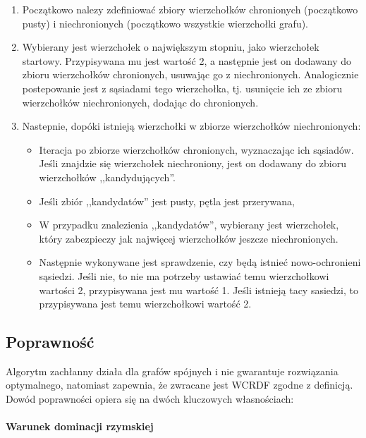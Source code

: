     \begin{enumerate}
        \item Początkowo nalezy zdefiniować zbiory wierzchołków chronionych (początkowo pusty) i niechronionych (początkowo wszystkie wierzchołki grafu).
        \item Wybierany jest wierzchołek o największym stopniu, jako wierzchołek startowy. Przypisywana mu jest wartość 2, a następnie jest on dodawany do zbioru wierzchołków chronionych, usuwając go z niechronionych. Analogicznie postepowanie jest z sąsiadami tego wierzchołka, tj. usunięcie ich ze zbioru wierzchołków niechronionych, dodając do chronionych. 
        \item Nastepnie, dopóki istnieją wierzchołki w zbiorze wierzchołków niechronionych:
        \begin{itemize}
            \item Iteracja po zbiorze wierzchołków chronionych, wyznaczając ich sąsiadów. Jeśli znajdzie się wierzchołek niechroniony, jest on dodawany do zbioru wierzchołków ,,kandydujących''.
            \item Jeśli zbiór ,,kandydatów'' jest pusty, pętla jest przerywana,
            \item W przypadku znalezienia ,,kandydatów'', wybierany jest wierzchołek, który zabezpieczy jak najwięcej wierzchołków jeszcze niechronionych.
            \item Następnie wykonywane jest sprawdzenie, czy będą istnieć nowo-ochronieni sąsiedzi. Jeśli nie, to nie ma potrzeby ustawiać temu wierzchołkowi wartości 2, przypisywana jest mu wartość 1. Jeśli istnieją tacy sasiedzi, to przypisywana jest temu wierzchołkowi wartość 2. 
        \end{itemize}
    \end{enumerate}

    \subsection{Poprawność}

    Algorytm zachłanny działa dla grafów spójnych i nie gwarantuje rozwiązania optymalnego, natomiast zapewnia, że zwracane jest WCRDF zgodne z definicją. Dowód poprawności opiera się na dwóch kluczowych własnościach:

    \paragraph{Warunek dominacji rzymskiej}

